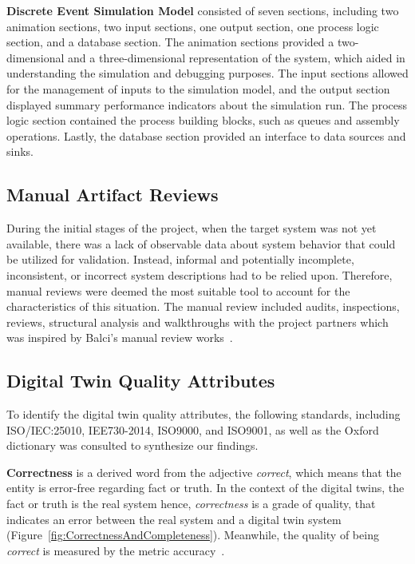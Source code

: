 \documentclass{llncs}
\begin{document}
    \textbf{Discrete Event Simulation Model} consisted of seven sections, including two animation sections, two input sections, one output section, one process logic section, and a database section. 
    The animation sections provided a two-dimensional and a three-dimensional representation of the system, 
    which aided in understanding the simulation and debugging purposes. The input sections allowed for the management of inputs to the simulation model, and the output section displayed summary performance indicators about the simulation run. 
    The process logic section contained the process building blocks, such as queues and assembly operations. Lastly, the database section provided an interface to data sources and sinks.
    
    \subsection{Manual Artifact Reviews}
    During the initial stages of the project, when the target system was not yet available,
    there was a lack of observable data about system behavior that could be utilized for validation. 
    Instead, informal and potentially incomplete, inconsistent, or incorrect system descriptions had to be relied upon. 
    Therefore, manual reviews were deemed the most suitable tool to account for the characteristics of this situation.
    The manual review included audits, inspections, reviews, structural analysis and walkthroughs 
    with the project partners which was inspired by Balci's manual review works~\cite{balcitechniques}. 
    
    \subsection{Digital Twin Quality Attributes}\label{section:Digital Twin Quality Attributes}
    To identify the digital twin quality attributes, the following standards, including ISO/IEC:25010, IEE730-2014, ISO9000, and ISO9001, 
    as well as the Oxford dictionary was consulted to 
    synthesize our findings\cite{ISO9000,ISO90012015,ISO/IEC:25010,IEE7302014,OxfordDictionary}.

    \textbf{Correctness} is a  derived word from the adjective \textit{correct}, which means that the entity is error-free regarding fact or truth. 
    In the context of the digital twins, the fact or truth is the real system hence, \textit{correctness} is a grade of quality, 
    that indicates an error between the real system and a digital twin system (Figure~\ref{fig:CorrectnessAndCompleteness}).
    Meanwhile, the quality of being \textit{correct} is measured by the metric accuracy~\cite{OxfordDictionary}. 
\end{document}
